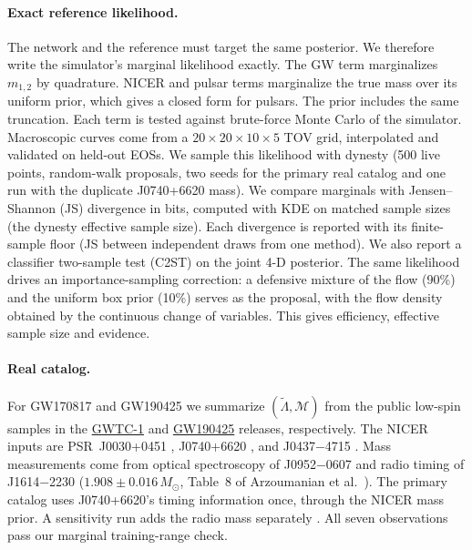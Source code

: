 \documentclass{article}
\newcommand{\Msun}{M_\odot}
\newcommand{\Lt}{\tilde{\Lambda}}
\newcommand{\Mc}{\mathcal{M}}
\begin{document}
\paragraph{Exact reference likelihood.} The network and the reference must target the same posterior. We therefore write the simulator's marginal likelihood exactly. The GW term marginalizes $m_{1,2}$ by quadrature. NICER and pulsar terms marginalize the true mass over its uniform prior, which gives a closed form for pulsars. The prior includes the same truncation. Each term is tested against brute-force Monte Carlo of the simulator. Macroscopic curves come from a $20\times20\times10\times5$ TOV grid, interpolated and validated on held-out EOSs. We sample this likelihood with dynesty \citep{speagle2020dynesty} (500 live points, random-walk proposals, two seeds for the primary real catalog and one run with the duplicate J0740+6620 mass). We compare marginals with Jensen--Shannon (JS) divergence in bits, computed with KDE on matched sample sizes (the dynesty effective sample size). Each divergence is reported with its finite-sample floor (JS between independent draws from one method). We also report a classifier two-sample test (C2ST) \citep{lopezpaz2017revisiting} on the joint 4-D posterior. The same likelihood drives an importance-sampling correction: a defensive mixture of the flow (90\%) and the uniform box prior (10\%) serves as the proposal, with the flow density obtained by the continuous change of variables. This gives efficiency, effective sample size and evidence.

\paragraph{Real catalog.} For GW170817 and GW190425 we summarize $(\Lt,\Mc)$ from the public low-spin samples in the \href{https://dcc.ligo.org/LIGO-P1800370/public}{GWTC-1} and \href{https://dcc.ligo.org/LIGO-P2000026/public}{GW190425} releases, respectively. The NICER inputs are PSR~J0030+0451 \citep{riley2019nicer}, J0740+6620 \citep{riley2021nicer}, and J0437$-$4715 \citep{choudhury2024j0437}. Mass measurements come from optical spectroscopy of J0952$-$0607 \citep{romani2022psr} and radio timing of J1614$-$2230 ($1.908\pm0.016\,\Msun$, Table~8 of Arzoumanian et al.~\citep{arzoumanian2018timing}). The primary catalog uses J0740+6620's timing information once, through the NICER mass prior. A sensitivity run adds the radio mass separately \citep{fonseca2021refined}. All seven observations pass our marginal training-range check.
\end{document}
